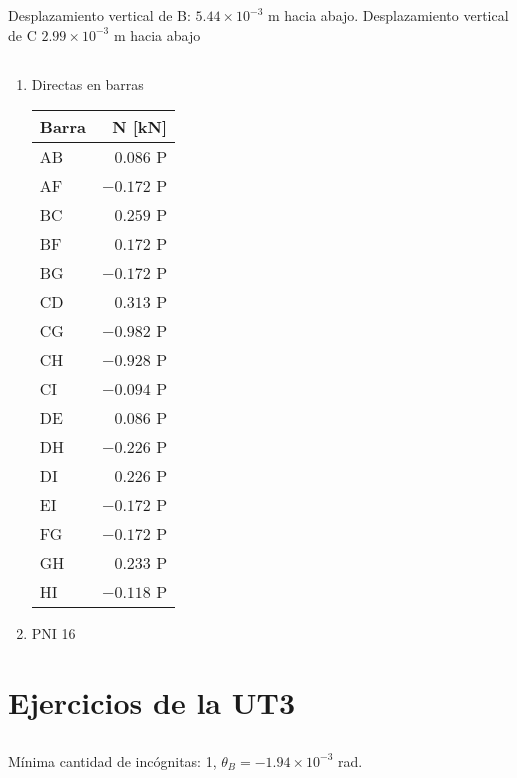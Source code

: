 Desplazamiento vertical de B: $5.44 \times 10^{-3}$ m hacia abajo. Desplazamiento vertical de C $ 2.99 \times 10^{-3}$ m hacia abajo


\subsection{}

\begin{enumerate}[label=\alph*)]
	\item
Directas en barras

\begin{center}
	\begin{tabular}{lr}
		\hline
		Barra & N [kN] \\
		\hline
AB & $0.086$ P \\
AF & $-0.172$ P \\
BC & $0.259$ P \\
BF & $0.172$ P \\
BG & $-0.172$ P \\
CD & $0.313$ P \\
CG & $-0.982$ P \\
CH & $-0.928$ P \\
CI & $-0.094$ P \\
DE & $0.086$ P \\
DH & $-0.226$ P \\
DI & $0.226$ P \\
EI & $-0.172$ P \\
FG & $-0.172$ P \\
GH & $0.233$ P \\
HI & $-0.118$ P \\
\hline
\end{tabular}
\end{center}

\item PNI 16
\end{enumerate}








\section{Ejercicios de la UT3}


\subsection{}
Mínima cantidad de incógnitas: 1, $\theta_B = -1.94 \times 10^{-3}$ rad.

